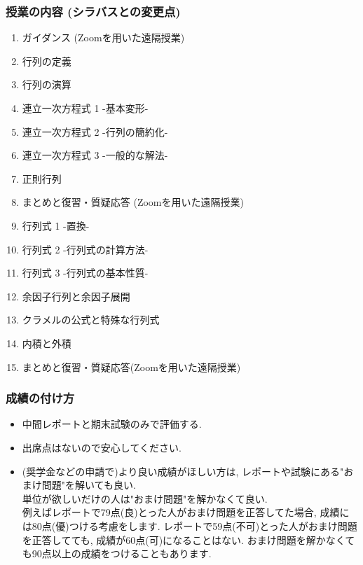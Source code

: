 \documentclass[11pt,dvipdfmx]{beamer}
\theoremstyle{definition}
\theoremstyle{remark}
\begin{document}

\begin{frame}
\frametitle{授業の内容 (シラバスとの変更点)}
\begin{enumerate}
\item ガイダンス (Zoomを用いた遠隔授業)
\item 行列の定義
\item 行列の演算
\item 連立一次方程式 1 -基本変形-
\item 連立一次方程式 2 -行列の簡約化-
\item 連立一次方程式 3 -一般的な解法-
\item 正則行列
\item まとめと復習・質疑応答 (Zoomを用いた遠隔授業)
\item 行列式 1 -置換-
\item 行列式 2 -行列式の計算方法-
\item 行列式 3 -行列式の基本性質-
\item 余因子行列と余因子展開
\item クラメルの公式と特殊な行列式
\item 内積と外積
\item まとめと復習・質疑応答(Zoomを用いた遠隔授業)
\end{enumerate}


\end{frame}

\begin{frame}
\frametitle{成績の付け方}
 \begin{itemize}
 \item 中間レポートと期末試験のみで評価する. 
 \item 出席点はないので安心してください.
 \item (奨学金などの申請で)より良い成績がほしい方は, レポートや試験にある"おまけ問題"を解いても良い. \\
 単位が欲しいだけの人は"おまけ問題"を解かなくて良い. \\
 {\tiny 例えばレポートで79点(良)とった人がおまけ問題を正答してた場合, 成績には80点(優)つける考慮をします.
 レポートで59点(不可)とった人がおまけ問題を正答してても, 成績が60点(可)になることはない. }
{\tiny  おまけ問題を解かなくても90点以上の成績をつけることもあります.}
 \end{itemize}


\end{frame}
\end{document}
